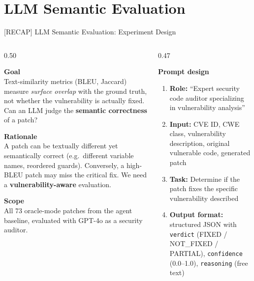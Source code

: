 \documentclass[aspectratio=169,10pt]{beamer}
\begin{document}
\section{LLM Semantic Evaluation}

\begin{frame}{[RECAP] LLM Semantic Evaluation: Experiment Design}
\begin{columns}[T]
\begin{column}{0.50\textwidth}

  \textbf{Goal}\\[3pt]
  {\small Text-similarity metrics (BLEU, Jaccard) measure \textit{surface overlap}
  with the ground truth, not whether the vulnerability is actually fixed.
  Can an LLM judge the \textbf{semantic correctness} of a patch?}

  \vspace{0.6em}
  \textbf{Rationale}\\[3pt]
  {\small A patch can be textually different yet semantically correct
  (e.g.\ different variable names, reordered guards).
  Conversely, a high-BLEU patch may miss the critical fix.
  We need a \textbf{vulnerability-aware} evaluation.}

  \vspace{0.6em}
  \textbf{Scope}\\[3pt]
  {\small All 73 oracle-mode patches from the agent baseline, evaluated
  with GPT-4o as a security auditor.}

\end{column}
\begin{column}{0.47\textwidth}

  \textbf{Prompt design}

  \vspace{0.3em}
  {\scriptsize
  \begin{enumerate}\setlength{\itemsep}{3pt}
    \item \textbf{Role:} ``Expert security code auditor specializing
          in vulnerability analysis''
    \item \textbf{Input:} CVE ID, CWE class, vulnerability description,
          original vulnerable code, generated patch
    \item \textbf{Task:} Determine if the patch fixes the specific
          vulnerability described
    \item \textbf{Output format:} structured JSON with
          \texttt{verdict} (FIXED / NOT\_FIXED / PARTIAL),
          \texttt{confidence} (0.0--1.0),
          \texttt{reasoning} (free text)
  \end{enumerate}}


\end{column}
\end{columns}
\end{frame}
\end{document}
